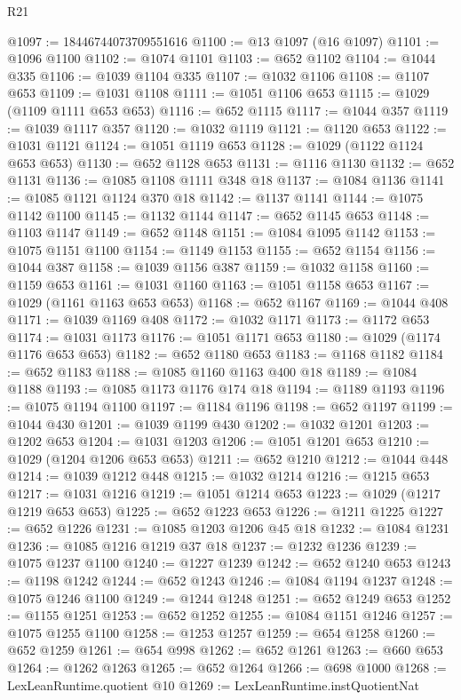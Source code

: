\begin{lexlean}{R21}
\begin{coremodule}
@1097 := 18446744073709551616
@1100 := @13 @1097 (@16 @1097)
@1101 := @1096 @1100
@1102 := @1074 @1101
@1103 := @652 @1102
@1104 := @1044 @335
@1106 := @1039 @1104 @335
@1107 := @1032 @1106
@1108 := @1107 @653
@1109 := @1031 @1108
@1111 := @1051 @1106 @653
@1115 := @1029 (@1109 @1111 @653 @653)
@1116 := @652 @1115
@1117 := @1044 @357
@1119 := @1039 @1117 @357
@1120 := @1032 @1119
@1121 := @1120 @653
@1122 := @1031 @1121
@1124 := @1051 @1119 @653
@1128 := @1029 (@1122 @1124 @653 @653)
@1130 := @652 @1128 @653
@1131 := @1116 @1130
@1132 := @652 @1131
@1136 := @1085 @1108 @1111 @348 @18
@1137 := @1084 @1136
@1141 := @1085 @1121 @1124 @370 @18
@1142 := @1137 @1141
@1144 := @1075 @1142 @1100
@1145 := @1132 @1144
@1147 := @652 @1145 @653
@1148 := @1103 @1147
@1149 := @652 @1148
@1151 := @1084 @1095 @1142
@1153 := @1075 @1151 @1100
@1154 := @1149 @1153
@1155 := @652 @1154
@1156 := @1044 @387
@1158 := @1039 @1156 @387
@1159 := @1032 @1158
@1160 := @1159 @653
@1161 := @1031 @1160
@1163 := @1051 @1158 @653
@1167 := @1029 (@1161 @1163 @653 @653)
@1168 := @652 @1167
@1169 := @1044 @408
@1171 := @1039 @1169 @408
@1172 := @1032 @1171
@1173 := @1172 @653
@1174 := @1031 @1173
@1176 := @1051 @1171 @653
@1180 := @1029 (@1174 @1176 @653 @653)
@1182 := @652 @1180 @653
@1183 := @1168 @1182
@1184 := @652 @1183
@1188 := @1085 @1160 @1163 @400 @18
@1189 := @1084 @1188
@1193 := @1085 @1173 @1176 @174 @18
@1194 := @1189 @1193
@1196 := @1075 @1194 @1100
@1197 := @1184 @1196
@1198 := @652 @1197
@1199 := @1044 @430
@1201 := @1039 @1199 @430
@1202 := @1032 @1201
@1203 := @1202 @653
@1204 := @1031 @1203
@1206 := @1051 @1201 @653
@1210 := @1029 (@1204 @1206 @653 @653)
@1211 := @652 @1210
@1212 := @1044 @448
@1214 := @1039 @1212 @448
@1215 := @1032 @1214
@1216 := @1215 @653
@1217 := @1031 @1216
@1219 := @1051 @1214 @653
@1223 := @1029 (@1217 @1219 @653 @653)
@1225 := @652 @1223 @653
@1226 := @1211 @1225
@1227 := @652 @1226
@1231 := @1085 @1203 @1206 @45 @18
@1232 := @1084 @1231
@1236 := @1085 @1216 @1219 @37 @18
@1237 := @1232 @1236
@1239 := @1075 @1237 @1100
@1240 := @1227 @1239
@1242 := @652 @1240 @653
@1243 := @1198 @1242
@1244 := @652 @1243
@1246 := @1084 @1194 @1237
@1248 := @1075 @1246 @1100
@1249 := @1244 @1248
@1251 := @652 @1249 @653
@1252 := @1155 @1251
@1253 := @652 @1252
@1255 := @1084 @1151 @1246
@1257 := @1075 @1255 @1100
@1258 := @1253 @1257
@1259 := @654 @1258
@1260 := @652 @1259
@1261 := @654 @998
@1262 := @652 @1261
@1263 := @660 @653
@1264 := @1262 @1263
@1265 := @652 @1264
@1266 := @698 @1000
@1268 := LexLeanRuntime.quotient @10
@1269 := LexLeanRuntime.instQuotientNat

\end{coremodule}
\end{lexlean}
